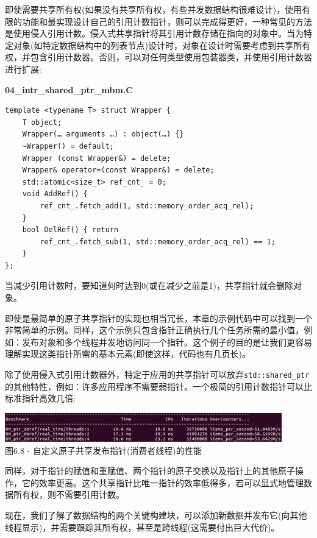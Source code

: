 即使需要共享所有权(如果没有共享所有权，有些并发数据结构很难设计)，使用有限的功能和最实现设计自己的引用计数指针，则可以完成得更好，一种常见的方法是使用侵入引用计数。侵入式共享指针将其引用计数存储在指向的对象中。当为特定对象(如特定数据结构中的列表节点)设计时，对象在设计时需要考虑到共享所有权，并包含引用计数器。否则，可以对任何类型使用包装器类，并使用引用计数器进行扩展:

\noindent
\textbf{04\_intr\_shared\_ptr\_mbm.C}
\begin{lstlisting}[style=styleCXX]
template <typename T> struct Wrapper {
	T object;
	Wrapper(… arguments …) : object(…) {}
	~Wrapper() = default;
	Wrapper (const Wrapper&) = delete;
	Wrapper& operator=(const Wrapper&) = delete;
	std::atomic<size_t> ref_cnt_ = 0;
	void AddRef() {
		ref_cnt_.fetch_add(1, std::memory_order_acq_rel);
	}
	bool DelRef() { return
		ref_cnt_.fetch_sub(1, std::memory_order_acq_rel) == 1;
	}
};
\end{lstlisting}

当减少引用计数时，要知道何时达到0(或在减少之前是1)，共享指针就会删除对象。

即使是最简单的原子共享指针的实现也相当冗长，本章的示例代码中可以找到一个非常简单的示例。同样，这个示例只包含指针正确执行几个任务所需的最小值，例如：发布对象和多个线程并发地访问同一个指针。这个例子的目的是让我们更容易理解实现这类指针所需的基本元素(即使这样，代码也有几页长)。

除了使用侵入式引用计数器外，特定于应用的共享指针可以放弃\texttt{std::shared\_ptr}的其他特性，例如：许多应用程序不需要弱指针。一个极简的引用计数指针可以比标准指针高效几倍:

\begin{center}
\includegraphics[width=0.9\textwidth]{content/2/chapter6/images/8.jpg}\\
图6.8 - 自定义原子共享发布指针(消费者线程)的性能
\end{center}

同样，对于指针的赋值和重赋值、两个指针的原子交换以及指针上的其他原子操作，它的效率更高。这个共享指针比唯一指针的效率低得多，若可以显式地管理数据所有权，则不需要引用计数。

现在，我们了解了数据结构的两个关键构建块，可以添加新数据并发布它(向其他线程显示)，并需要跟踪其所有权，甚至是跨线程(这需要付出巨大代价)。




















